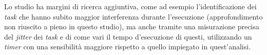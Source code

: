 \documentclass{article}
\begin{document}
Lo studio ha margini di ricerca aggiuntiva, come ad esempio l'identificazione dei \textit{task} che hanno subito maggior interferenza durante l'esecuzione (approfondimento non riuscito a pieno in questo studio), ma anche tramite una misurazione precisa del \textit{jitter} dei \textit{task} e di come vari il tempo d'esecuzione di questi, utilizzando un \textit{timer} con una sensibilità maggiore rispetto a quello impiegato in quest'analisi.
\end{document}
